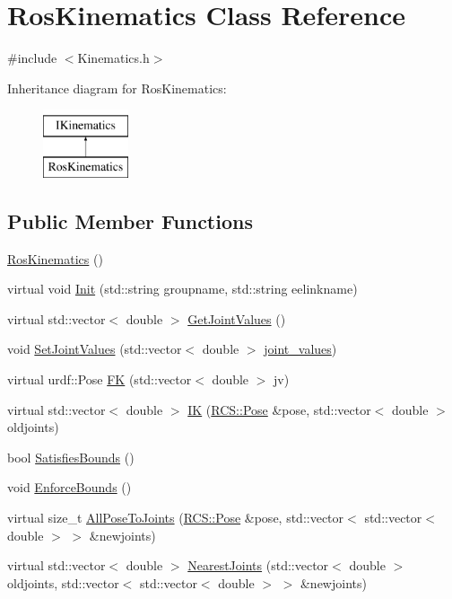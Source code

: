 \hypertarget{classRosKinematics}{\section{Ros\-Kinematics Class Reference}
\label{classRosKinematics}
}


{\ttfamily \#include $<$Kinematics.\-h$>$}

Inheritance diagram for Ros\-Kinematics\-:\begin{figure}[H]
\begin{center}
\leavevmode
\includegraphics[height=2.000000cm]{classRosKinematics}
\end{center}
\end{figure}
\subsection*{Public Member Functions}
\begin{DoxyCompactItemize}
\item 
\hyperlink{classRosKinematics_a9dc704b4556f6db399ad18cea7d6259b}{Ros\-Kinematics} ()
\item 
virtual void \hyperlink{classRosKinematics_a307da5d4456621c4cc2dce412be30db3}{Init} (std\-::string groupname, std\-::string eelinkname)
\item 
virtual std\-::vector$<$ double $>$ \hyperlink{classRosKinematics_ab3e293c7f5d7220fa7ee91256321ec92}{Get\-Joint\-Values} ()
\item 
void \hyperlink{classRosKinematics_af9af8957f54e5d2343b2ab00dcb55525}{Set\-Joint\-Values} (std\-::vector$<$ double $>$ \hyperlink{classRosKinematics_af95c3ba0edaccafeb68022895b9824ac}{joint\-\_\-values})
\item 
virtual urdf\-::\-Pose \hyperlink{classRosKinematics_ac892e14e3d6b14efbc4908404cd9e706}{F\-K} (std\-::vector$<$ double $>$ jv)
\item 
virtual std\-::vector$<$ double $>$ \hyperlink{classRosKinematics_ae8f76a870595ca94d3876bbe51c7b142}{I\-K} (\hyperlink{namespaceRCS_aac02c0fd845140ea93a2a9254b1db6f6}{R\-C\-S\-::\-Pose} \&pose, std\-::vector$<$ double $>$ oldjoints)
\item 
bool \hyperlink{classRosKinematics_ae51c062c810983b29d418399d38da42f}{Satisfies\-Bounds} ()
\item 
void \hyperlink{classRosKinematics_a19e0993e7e188491918785f4ca6ce115}{Enforce\-Bounds} ()
\item 
virtual size\-\_\-t \hyperlink{classRosKinematics_ae3d78b75e8cbd38a12d451e0e0e95548}{All\-Pose\-To\-Joints} (\hyperlink{namespaceRCS_aac02c0fd845140ea93a2a9254b1db6f6}{R\-C\-S\-::\-Pose} \&pose, std\-::vector$<$ std\-::vector$<$ double $>$ $>$ \&newjoints)
\item 
virtual std\-::vector$<$ double $>$ \hyperlink{classRosKinematics_ab50d3e7666cf3b2bdb1ae3d5e0a7db8e}{Nearest\-Joints} (std\-::vector$<$ double $>$ oldjoints, std\-::vector$<$ std\-::vector$<$ double $>$ $>$ \&newjoints)
\end{DoxyCompactItemize}
